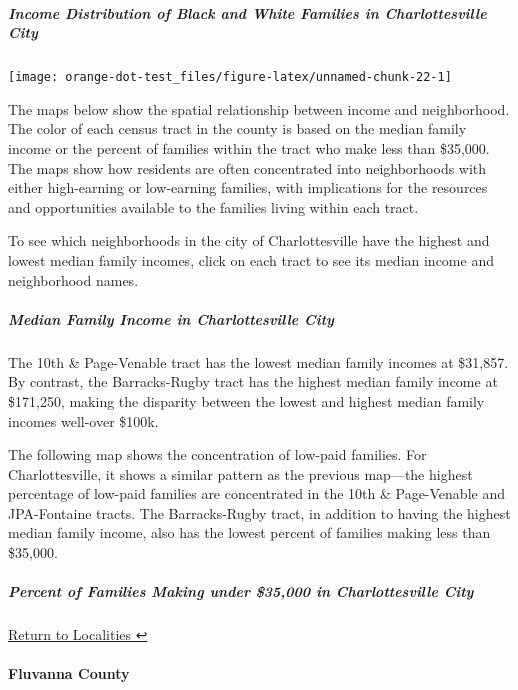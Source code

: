 \documentclass[
]{article}
\begin{document}
\hypertarget{income-distribution-of-black-and-white-families-in-charlottesville-city}{%
\subparagraph{Income Distribution of Black and White Families in
Charlottesville
City}\label{income-distribution-of-black-and-white-families-in-charlottesville-city}}

\begin{center}\texttt{[image: orange-dot-test\_files/figure-latex/unnamed-chunk-22-1]} \end{center}

The maps below show the spatial relationship between income and
neighborhood. The color of each census tract in the county is based on
the median family income or the percent of families within the tract who
make less than \$35,000. The maps show how residents are often
concentrated into neighborhoods with either high-earning or low-earning
families, with implications for the resources and opportunities
available to the families living within each tract.

To see which neighborhoods in the city of Charlottesville have the
highest and lowest median family incomes, click on each tract to see its
median income and neighborhood names.

\hypertarget{median-family-income-in-charlottesville-city}{%
\subparagraph{Median Family Income in Charlottesville
City}\label{median-family-income-in-charlottesville-city}}

The 10th \& Page-Venable tract has the lowest median family incomes at
\$31,857. By contrast, the Barracks-Rugby tract has the highest median
family income at \$171,250, making the disparity between the lowest and
highest median family incomes well-over \$100k.

The following map shows the concentration of low-paid families. For
Charlottesville, it shows a similar pattern as the previous map---the
highest percentage of low-paid families are concentrated in the 10th \&
Page-Venable and JPA-Fontaine tracts. The Barracks-Rugby tract, in
addition to having the highest median family income, also has the lowest
percent of families making less than \$35,000.

\hypertarget{percent-of-families-making-under-35000-in-charlottesville-city}{%
\subparagraph{Percent of Families Making under \$35,000 in
Charlottesville
City}\label{percent-of-families-making-under-35000-in-charlottesville-city}}

\protect\hyperlink{localities}{Return to Localities ↩︎}

\hypertarget{fluvanna-county}{%
\paragraph{Fluvanna County}\label{fluvanna-county}}
\end{document}
